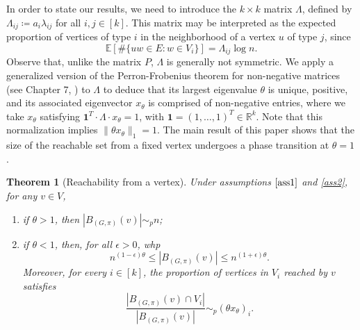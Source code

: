 \documentclass[11pt]{article}
\numberwithin{equation}{section}
\newtheorem{theorem}{Theorem}[section]
\theoremstyle{definition}
\newcommand\bE{{\mathbb E}}
\begin{document}
In order to state our results, we need to introduce the $k\times k$ matrix $\Lambda$, defined by $\Lambda_{ij} \coloneqq a_i \lambda_{ij}$ for all $i,j\in [k]$. This matrix may be interpreted as the expected proportion of vertices of type $i$ in the neighborhood of a vertex $u$ of type $j$, since
$$\bE[\#\{uw \in E : w\in V_i \}]= \Lambda_{ij} \log n.$$
Observe that, unlike the matrix $P$, $\Lambda$ is generally not symmetric. %
We apply a generalized version of the Perron-Frobenius theorem for non-negative matrices (see Chapter 7, \cite{M23}) to $\Lambda$ to deduce that its largest eigenvalue $\theta$ is unique, positive, and its associated eigenvector $x_\theta$ is comprised of non-negative entries, where we take $x_\theta$ satisfying $\boldsymbol{1}^T\cdot \Lambda \cdot x_\theta = 1$, with $\boldsymbol{1} = (1,\ldots,1)^T \in \mathbb{R}^k$. Note that this normalization implies $\|\theta x_{\theta}\|_1=1$. The main result of this paper shows that the size of the reachable set from a fixed vertex undergoes a phase transition at $\theta = 1$.

\begin{theorem}[Reachability from a vertex]\label{thm_reachability} Under assumptions $\ref{ass1}$ and \ref{ass2}, for any $v\in V$,
\begin{enumerate}[label=(\roman*)]
	\item \label{supercritical_reachability} if $\theta>1$, then $|B_{(G,\pi)}(v)| \sim_p n$;
	\item \label{subcritical_reachability} if $\theta<1$, then, for all $\epsilon > 0$, whp $$n^{(1-\epsilon)\theta} \leq |B_{(G,\pi)}(v)| \leq n^{(1+\epsilon)\theta}.$$ Moreover, for every $i \in [k]$, the proportion of vertices in $V_i$ reached by $v$ satisfies
	$$ \frac{|B_{(G,\pi)}(v)\cap V_i|}{|B_{(G,\pi)}(v)|} \sim_p (\theta x_\theta)_i.$$
\end{enumerate}
\end{theorem}
\end{document}
